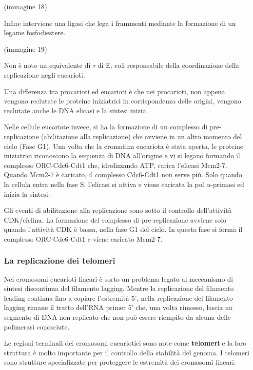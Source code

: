 \documentclass[]{article}
\begin{document}
(immagine 18)

Infine interviene una ligasi che lega i frammenti mediante la formazione
di un legame fosfodiestere.

(immagine 19)

Non è noto un equivalente di $\tau$ di E. coli responsabile della
coordinazione della replicazione negli eucarioti.

Una differenza tra procarioti ed eucarioti è che nei procarioti, non
appena vengono reclutate le proteine iniziatrici in corrispondenza delle
origini, vengono reclutate anche le DNA elicasi e la sintesi inizia.

Nelle cellule eucariote invece, si ha la formazione di un complesso di
pre-replicazione (abilitazione alla replicazione) che avviene in un
altro momento del ciclo (Fase G1). Una volta che la cromatina eucariota
è stata aperta, le proteine iniziatrici riconoscono la sequenza di DNA
all'origine e vi si legano formando il complesso ORC-Cdc6-Cdt1 che,
idrolizzando ATP, carica l'elicasi Mcm2-7. Quando Mcm2-7 è caricato, il
complesso Cdc6-Cdt1 non serve più. Solo quando la cellula entra nella
fase S, l'elicasi si attiva e viene caricata la pol $\alpha$-primasi ed
inizia la sintesi.

Gli eventi di abilitazione alla replicazione sono sotto il controllo
dell'attività CDK/ciclina. La formazione del complesso di
pre-replicazione avviene solo quando l'attività CDK è bassa, nella fase
G1 del ciclo. In questa fase si forma il complesso ORC-Cdc6-Cdt1 e viene
caricato Mcm2-7.

\subsubsection{La replicazione dei
telomeri}\label{la-replicazione-dei-telomeri}

Nei cromosomi eucarioti lineari è sorto un problema legato al meccanismo
di sintesi discontinua del filamento lagging. Mentre la replicazione del
filamento leading continua fino a copiare l'estremità 5', nella
replicazione del filamento lagging rimane il tratto dell'RNA primer 5'
che, una volta rimosso, lascia un segmento di DNA non replicato che non
può essere riempito da alcuna delle polimerasi conosciute.

Le regioni terminali dei cromosomi eucariotici sono note come
\textbf{telomeri} e la loro struttura è molto importante per il
controllo della stabilità del genoma. I telomeri sono strutture
specializzate per proteggere le estremità dei cromosomi lineari.
\end{document}
